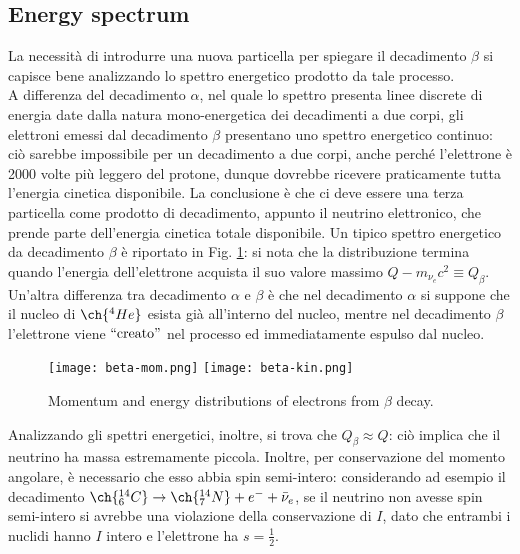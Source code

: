 \subsection{Energy spectrum}

La necessità di introdurre una nuova particella per spiegare il decadimento $ \beta $ si capisce bene analizzando lo spettro energetico prodotto da tale processo.\\
A differenza del decadimento $ \alpha $, nel quale lo spettro presenta linee discrete di energia date dalla natura mono-energetica dei decadimenti a due corpi, gli elettroni emessi dal decadimento $ \beta $ presentano uno spettro energetico continuo: ciò sarebbe impossibile per un decadimento a due corpi, anche perché l'elettrone è 2000 volte più leggero del protone, dunque dovrebbe ricevere praticamente tutta l'energia cinetica disponibile. La conclusione è che ci deve essere una terza particella come prodotto di decadimento, appunto il neutrino elettronico, che prende parte dell'energia cinetica totale disponibile.
Un tipico spettro energetico da decadimento $ \beta $ è riportato in Fig. \ref{beta-spectrum}: si nota che la distribuzione termina quando l'energia dell'elettrone acquista il suo valore massimo $ Q - m_{\nu_e} c^2 \equiv Q_{\beta} $.\\
Un'altra differenza tra decadimento $ \alpha $ e $ \beta $ è che nel decadimento $ \alpha $ si suppone che il nucleo di $ \ch{^4 He} $ esista già all'interno del nucleo, mentre nel decadimento $ \beta $ l'elettrone viene $ ``\text{creato}" $ nel processo ed immediatamente espulso dal nucleo.

\begin{figure}[b!]
	\centering
	\texttt{[image: beta-mom.png]}
	\texttt{[image: beta-kin.png]}
	\caption{Momentum and energy distributions of electrons from $ \beta $ decay.}
	\label{beta-spectrum}
\end{figure}

Analizzando gli spettri energetici, inoltre, si trova che $ Q_{\beta} \approx Q $: ciò implica che il neutrino ha massa estremamente piccola. Inoltre, per conservazione del momento angolare, è necessario che esso abbia spin semi-intero: considerando ad esempio il decadimento $ \ch{^{14}_6 C} \rightarrow \ch{^{14}_7 N} + e^- + \bar{\nu}_e $, se il neutrino non avesse spin semi-intero si avrebbe una violazione della conservazione di $ I $, dato che entrambi i nuclidi hanno $ I $ intero e l'elettrone ha $ s = \frac{1}{2} $.

